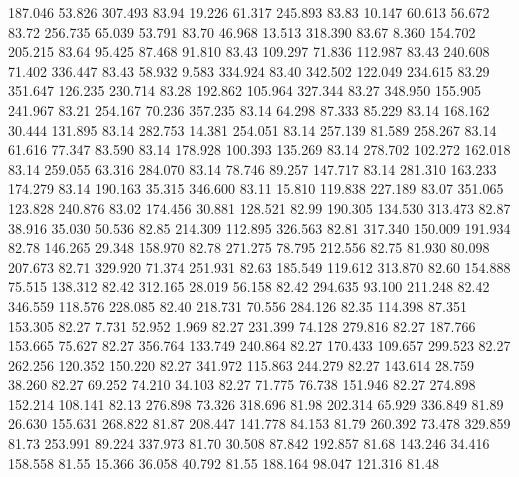  187.046   53.826  307.493        83.94
  19.226   61.317  245.893        83.83
  10.147   60.613   56.672        83.72
 256.735   65.039   53.791        83.70
  46.968   13.513  318.390        83.67
   8.360  154.702  205.215        83.64
  95.425   87.468   91.810        83.43
 109.297   71.836  112.987        83.43
 240.608   71.402  336.447        83.43
  58.932    9.583  334.924        83.40
 342.502  122.049  234.615        83.29
 351.647  126.235  230.714        83.28
 192.862  105.964  327.344        83.27
 348.950  155.905  241.967        83.21
 254.167   70.236  357.235        83.14
  64.298   87.333   85.229        83.14
 168.162   30.444  131.895        83.14
 282.753   14.381  254.051        83.14
 257.139   81.589  258.267        83.14
  61.616   77.347   83.590        83.14
 178.928  100.393  135.269        83.14
 278.702  102.272  162.018        83.14
 259.055   63.316  284.070        83.14
  78.746   89.257  147.717        83.14
 281.310  163.233  174.279        83.14
 190.163   35.315  346.600        83.11
  15.810  119.838  227.189        83.07
 351.065  123.828  240.876        83.02
 174.456   30.881  128.521        82.99
 190.305  134.530  313.473        82.87
  38.916   35.030   50.536        82.85
 214.309  112.895  326.563        82.81
 317.340  150.009  191.934        82.78
 146.265   29.348  158.970        82.78
 271.275   78.795  212.556        82.75
  81.930   80.098  207.673        82.71
 329.920   71.374  251.931        82.63
 185.549  119.612  313.870        82.60
 154.888   75.515  138.312        82.42
 312.165   28.019   56.158        82.42
 294.635   93.100  211.248        82.42
 346.559  118.576  228.085        82.40
 218.731   70.556  284.126        82.35
 114.398   87.351  153.305        82.27
   7.731   52.952    1.969        82.27
 231.399   74.128  279.816        82.27
 187.766  153.665   75.627        82.27
 356.764  133.749  240.864        82.27
 170.433  109.657  299.523        82.27
 262.256  120.352  150.220        82.27
 341.972  115.863  244.279        82.27
 143.614   28.759   38.260        82.27
  69.252   74.210   34.103        82.27
  71.775   76.738  151.946        82.27
 274.898  152.214  108.141        82.13
 276.898   73.326  318.696        81.98
 202.314   65.929  336.849        81.89
  26.630  155.631  268.822        81.87
 208.447  141.778   84.153        81.79
 260.392   73.478  329.859        81.73
 253.991   89.224  337.973        81.70
  30.508   87.842  192.857        81.68
 143.246   34.416  158.558        81.55
  15.366   36.058   40.792        81.55
 188.164   98.047  121.316        81.48
